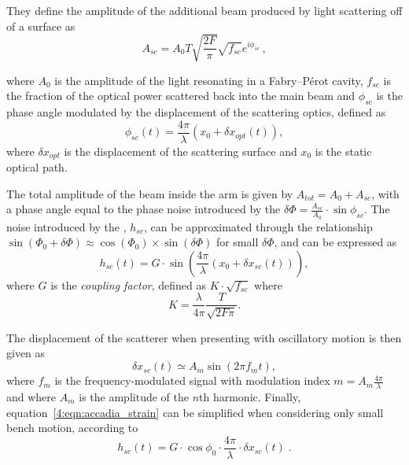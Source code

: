 They define the amplitude of the additional beam produced by light scattering off of a surface as
%
\begin{equation}
    A_{sc} = A_{0} T \sqrt{\frac{2 F}{\pi}} \sqrt{f_{sc}} e^{i \phi_{sc}}\,,
    \label{4:eqn:accadia_amplitude}
\end{equation}

%
where $A_{0}$ is the amplitude of the light resonating in a Fabry–Pérot cavity, $f_{sc}$ is the fraction of the optical power scattered back into the main beam and $\phi_{sc}$ is the phase angle modulated by the displacement of the scattering optics, defined as
%
\begin{equation}
    \phi_{sc}(t) = \frac{4 \pi}{\lambda} ( x_{0} + \delta x_{opt}(t) ),
    \label{4:eqn:accadia_phase_noise}
\end{equation}
%
where $\delta x_{opt}$ is the displacement of the scattering surface and $x_0$ is the static optical path.

The total amplitude of the beam inside the arm is given by $A_{tot} = A_{0} + A_{sc}$, with a phase angle equal to the phase noise introduced by the \scl{} $\delta \Phi = \frac{A_{sc}}{A_{0}} \cdot \sin \phi_{sc}$. The noise introduced by the \scl{}, $h_{sc}$, can be approximated through the relationship $\sin(\Phi_0+ \delta\Phi) \approx \cos(\Phi_0) \times \sin(\delta \Phi)$ for small $\delta\Phi$, and can be expressed as
%
\begin{equation}
    h_{sc}(t) = G \cdot \sin \left(\frac{4 \pi}{\lambda} (x_{0} + \delta x_{sc}(t) ) \right),
    \label{4:eqn:accadia_strain}
\end{equation}
%
where $G$ is the \emph{coupling factor}, defined as $K \cdot \sqrt{f_{sc}}$ where
%
\begin{equation}
K = \frac{\lambda}{4 \pi} \frac{T}{\sqrt{2 F \pi}}.
\end{equation}
%

The displacement of the scatterer when presenting with oscillatory motion is then given as
%
\begin{equation}
    \delta x_{sc} (t) \simeq A_{m} \sin(2 \pi f_{m} t),
    \label{4:eqn:accadia_oscillatory}
\end{equation}
%
where $f_{m}$ is the frequency-modulated signal with modulation index $m = A_{m} \frac{4 \pi}{\lambda}$ and where $A_{m}$ is the amplitude of the $n$th harmonic. Finally, equation~\ref{4:eqn:accadia_strain} can be simplified when considering only small bench motion, according to
%
\begin{equation}
    h_{sc}(t) = G \cdot \cos\phi_{0} \cdot \frac{4 \pi}{\lambda} \cdot \delta x_{sc}(t) \;.
    \label{4:eqn:accadia_strain_linearised}
\end{equation}


